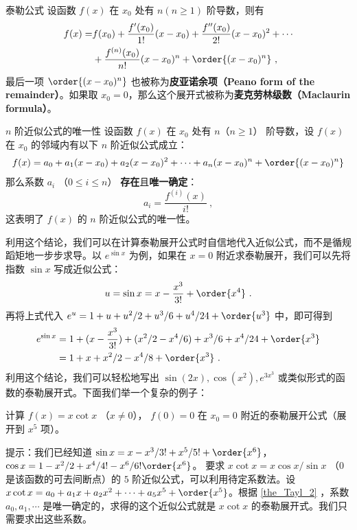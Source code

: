 
\begin{theorem}{泰勒公式}\label{the_Tayl_1}
设函数 $f(x)$ 在 $x_0$ 处有 $n(n\ge 1)$ 阶导数，则有
\begin{equation}\label{eq_Tayl_2}
\begin{aligned}
f(x)=&f(x_0)+\frac{f'(x_0)}{1!}(x-x_0)+\frac{f''(x_0)}{2!}(x-x_0)^2+\cdots\\
&+\frac{f^{(n)}(x_0)}{n!}(x-x_0)^n+\order{(x-x_0)^n}~,
\end{aligned}
\end{equation}
最后一项 $\order{(x-x_0)^n}$ 也被称为\textbf{皮亚诺余项（Peano form of the remainder）}。如果取 $x_0=0$，那么这个展开式被称为\textbf{麦克劳林级数（Maclaurin formula）}。
\end{theorem}
\begin{theorem}{$n$ 阶近似公式的唯一性}\label{the_Tayl_2}
设函数 $f(x)$ 在 $x_0$ 处有 $n$（$n\ge 1$） 阶导数，设 $f(x)$ 在 $x_0$ 的邻域内有以下 $n$ 阶近似公式成立：
\begin{equation}
\begin{aligned}
f(x)=a_0+a_1(x-x_0)+a_2(x-x_0)^2+\cdots+a_n(x-x_0)^n+\order{(x-x_0)^n}
\end{aligned}
\end{equation}
那么系数 $a_i$ （$0\le i\le n$） \textbf{存在}且\textbf{唯一确定}：
\begin{equation}
a_i=\frac{f^{(i)}(x)}{i!}~,
\end{equation}
这表明了 $f(x)$ 的 $n$ 阶近似公式的唯一性。
\end{theorem}
利用这个结论，我们可以在计算泰勒展开公式时自信地代入近似公式，而不是循规蹈矩地一步步求导。以 $e^{\sin x}$ 为例，如果在 $x=0$ 附近求泰勒展开，我们可以先将指数 $\sin x$ 写成近似公式：
\begin{equation}
u=\sin x=x-\frac{x^3}{3!}+\order{x^4}~.
\end{equation}
再将上式代入 $e^u=1+u+u^2/2+u^3/6+u^4/24+\order{u^3}$ 中，即可得到
\begin{equation}
\begin{aligned}
e^{\sin x}&=1+(x-\frac{x^3}{3!})+(x^2/2-x^4/6)+x^3/6+x^4/24+\order{x^3}
\\&=1+x+x^2/2-x^4/8+\order{x^3}~.
\end{aligned}
\end{equation}
利用这个结论，我们可以轻松地写出 $\sin (2x),\cos(x^2),e^{3x^3}$ 或类似形式的函数的泰勒展开式。下面我们举一个复杂的例子：
\begin{exercise}{}
计算 $f(x)=x\cot x$ （$x\neq 0$）， $f(0)=0$ 在 $x_0=0$ 附近的泰勒展开公式（展开到 $x^5$ 项）。
\end{exercise}
提示：我们已经知道 $\sin x=x-x^3/3!+x^5/5!+\order{x^6}$， $\cos x=1-x^2/2+x^4/4!-x^6/6!\order{x^6}$。 要求 $x\cot x=x\cos x/\sin x$ （$0$ 是该函数的可去间断点）的 $5$ 阶近似公式，可以利用待定系数法。设 $x\cot x=a_0+a_1 x+a_2 x^2+\cdots+ a_5 x^5 + \order{x^5}$。根据 \autoref{the_Tayl_2}  ，系数 $a_0,a_1,\cdots$ 是唯一确定的，求得的这个近似公式就是 $x\cot x$ 的泰勒展开式。我们只需要求出这些系数。

